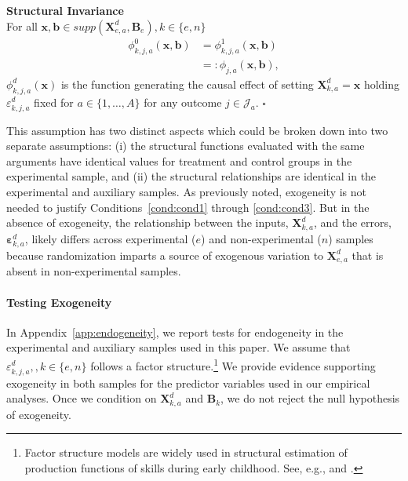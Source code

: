 \onehalfspacing
\begin{assumption} \label{ass:summary} \textbf{Structural Invariance}\\
For all $\bm{x}, \bm{b} \in supp(\bm{X}^d_{e,a}, \bm{B}_e), k \in \{e,n\}$
\begin{align}
\phi_{k,j,a}^0 \left( \bm{x}, \bm{b} \right) &= \phi_{k,j,a}^1 (\bm{x}, \bm{b}) \\   \nonumber
                                                                     &=: \phi_{j,a} (\bm{x}, \bm{b}),
\end{align}
$\phi^d_{k,j,a}(\bm{x})$ is the function generating the causal effect of setting $\bm{X}^d_{k,a}=\bm{x}$ holding $\varepsilon^d_{k,j,a}$ fixed for $a \in \{1,\dots,A\}$ for any outcome $j \in \mathcal{J}_{a}$. $\square$
\end{assumption}
\doublespacing

\noindent This assumption has two distinct aspects which could be broken down into two separate assumptions: (i) the structural functions evaluated with the same arguments have identical values for treatment and control groups in the experimental sample, and (ii) the structural relationships are identical in the experimental and auxiliary samples. As previously noted, exogeneity is not needed to justify Conditions~\ref{cond:cond1} through \ref{cond:cond3}. But in the absence of exogeneity, the relationship between the inputs, $\bm{X}^d_{k,a}$, and the errors, $\bm{\varepsilon}^d_{k,a}$, likely differs across experimental ($e$) and non-experimental ($n$) samples because randomization imparts a source of exogenous variation to $\bm{X}^d_{e,a}$ that is absent in non-experimental samples.

\paragraph{Testing Exogeneity}\label{section:accendog}

\noindent In  Appendix~\ref{app:endogeneity}, we report tests for endogeneity in the experimental and auxiliary samples used in this paper. We assume that $\varepsilon_{k,j,a}^d, , k \in \{e,n\}$ follows a factor structure.\footnote{Factor structure models are widely used in structural estimation of production functions of skills during early childhood. See, e.g., \cite{Cunha_Heckman_2008_JHR,Cunha_Heckman_etal_2010_est_tech_cognoncog} and \cite{Agostinelli_Wiswall_2016_EstimatingTech}.} We provide evidence supporting exogeneity in both samples for the predictor variables used in our empirical analyses. Once we condition on $\bm{X}_{k,a}^d$ and $\bm{B}_{k}$, we do not reject the null hypothesis of exogeneity.

